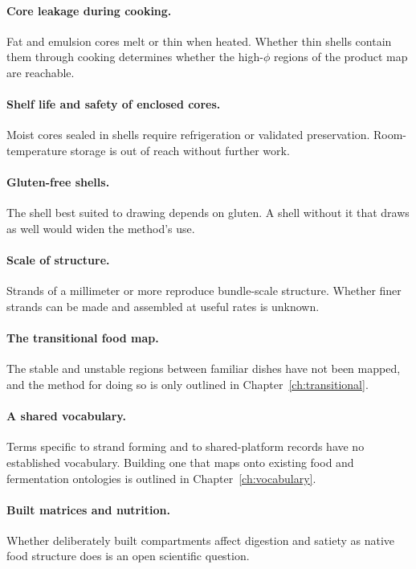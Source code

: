 \documentclass[11pt,openany]{book}
\theoremstyle{definition}
\begin{document}
\paragraph{Core leakage during cooking.} Fat and emulsion cores melt or thin when heated. Whether thin shells contain them through cooking determines whether the high-$\phi$ regions of the product map are reachable.

\paragraph{Shelf life and safety of enclosed cores.} Moist cores sealed in shells require refrigeration or validated preservation. Room-temperature storage is out of reach without further work.

\paragraph{Gluten-free shells.} The shell best suited to drawing depends on gluten. A shell without it that draws as well would widen the method's use.

\paragraph{Scale of structure.} Strands of a millimeter or more reproduce bundle-scale structure. Whether finer strands can be made and assembled at useful rates is unknown.

\paragraph{The transitional food map.} The stable and unstable regions between familiar dishes have not been mapped, and the method for doing so is only outlined in Chapter~\ref{ch:transitional}.

\paragraph{A shared vocabulary.} Terms specific to strand forming and to shared-platform records have no established vocabulary. Building one that maps onto existing food and fermentation ontologies is outlined in Chapter~\ref{ch:vocabulary}.

\paragraph{Built matrices and nutrition.} Whether deliberately built compartments affect digestion and satiety as native food structure does is an open scientific question.
\end{document}
